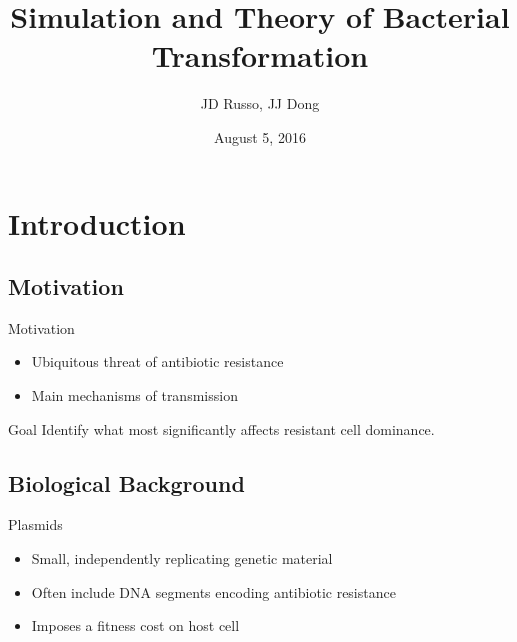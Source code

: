 \documentclass[12pt]{beamer}              %
\title{Simulation and Theory of Bacterial Transformation}
\date{August 5, 2016}
\author{JD Russo, JJ Dong}
\institute{Department of Physics and Astronomy\\Bucknell University}
\begin{document}
\maketitle

\section{Introduction}

\subsection{Motivation}
\begin{frame}{Motivation}
  \begin{itemize}
    \item Ubiquitous threat of antibiotic resistance
    \item Main mechanisms of transmission
  \end{itemize}

  \vspace*{\fill}
    \begin{alertblock}{Goal}
      Identify what most significantly affects resistant cell dominance.
    \end{alertblock}
  \vspace*{\fill}

\end{frame}



\subsection{Biological Background}
\begin{frame}[fragile]{Plasmids}
  \begin{itemize}
    \item Small, independently replicating genetic material
    \item Often include DNA segments encoding antibiotic resistance
    \item Imposes a fitness cost on host cell
  \end{itemize}
\end{frame}
\end{document}
